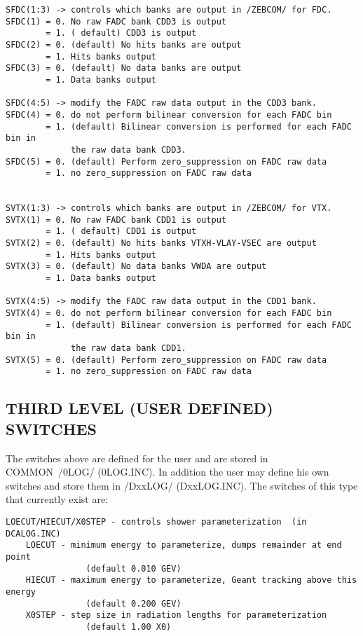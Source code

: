 \begin{verbatim}
SFDC(1:3) -> controls which banks are output in /ZEBCOM/ for FDC.
SFDC(1) = 0. No raw FADC bank CDD3 is output
        = 1. ( default) CDD3 is output
SFDC(2) = 0. (default) No hits banks are output
        = 1. Hits banks output
SFDC(3) = 0. (default) No data banks are output
        = 1. Data banks output

SFDC(4:5) -> modify the FADC raw data output in the CDD3 bank.
SFDC(4) = 0. do not perform bilinear conversion for each FADC bin
        = 1. (default) Bilinear conversion is performed for each FADC bin in
             the raw data bank CDD3.
SFDC(5) = 0. (default) Perform zero_suppression on FADC raw data
        = 1. no zero_suppression on FADC raw data


SVTX(1:3) -> controls which banks are output in /ZEBCOM/ for VTX.
SVTX(1) = 0. No raw FADC bank CDD1 is output
        = 1. ( default) CDD1 is output
SVTX(2) = 0. (default) No hits banks VTXH-VLAY-VSEC are output
        = 1. Hits banks output
SVTX(3) = 0. (default) No data banks VWDA are output
        = 1. Data banks output

SVTX(4:5) -> modify the FADC raw data output in the CDD1 bank.
SVTX(4) = 0. do not perform bilinear conversion for each FADC bin
        = 1. (default) Bilinear conversion is performed for each FADC bin in
             the raw data bank CDD1.
SVTX(5) = 0. (default) Perform zero_suppression on FADC raw data
        = 1. no zero_suppression on FADC raw data
\end{verbatim}

\subsection{THIRD LEVEL (USER DEFINED) SWITCHES}

The switches above are defined for the user and are stored in COMMON~/\D0LOG/
(\D0LOG.INC). In addition the user may define his own switches and store them
in /DxxLOG/ (DxxLOG.INC). The switches of this type that currently exist are:

\begin{verbatim}
LOECUT/HIECUT/X0STEP - controls shower parameterization  (in DCALOG.INC)
    LOECUT - minimum energy to parameterize, dumps remainder at end point
                (default 0.010 GEV)
    HIECUT - maximum energy to parameterize, Geant tracking above this energy
                (default 0.200 GEV)
    X0STEP - step size in radiation lengths for parameterization
                (default 1.00 X0)
\end{verbatim}


